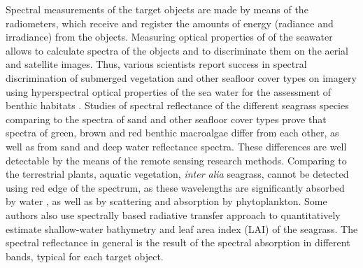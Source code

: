 \documentclass[10pt, a4paper]{article}
\begin{document}
Spectral measurements of the target objects are made
by means of the radiometers, which receive and register the amounts of energy (radiance and
irradiance) from the objects. Measuring optical properties of of the seawater allows to calculate spectra of the
objects and to discriminate them on the aerial and satellite images. Thus, various scientists report
success in spectral discrimination of submerged vegetation and other seafloor cover types on imagery
using hyperspectral optical properties of the sea water for the assessment of benthic habitats \cite{Lewis01,Louchard03,Dehouck08,Werdell03}\label{Lewis01}\label{Louchard03}\label{Dehouck08}\label{Werdell03}.
Studies of spectral reflectance of the different seagrass species comparing to the spectra of sand and
other seafloor cover types \cite{Vahtmae06}\label{Vahtmae06} prove that spectra of green, brown and red benthic
macroalgae differ from each other, as well as from sand and deep water reflectance spectra. These
differences are well detectable by the means of the remote sensing research methods. Comparing to
the terrestrial plants, aquatic vegetation, \textit{inter alia} seagrass, cannot be detected using red edge of the
spectrum, as these wavelengths are significantly absorbed by water \cite{Kirk94}\label{Kirk94}, as well as by
scattering and absorption by phytoplankton. Some authors \cite{Dierssen03}\label{Dierssen03} also use
spectrally based radiative transfer approach to quantitatively estimate shallow-water bathymetry and
leaf area index (LAI) of the seagrass. The spectral reflectance in general is the
result of the spectral absorption in different bands, typical for each target object.
\end{document}

